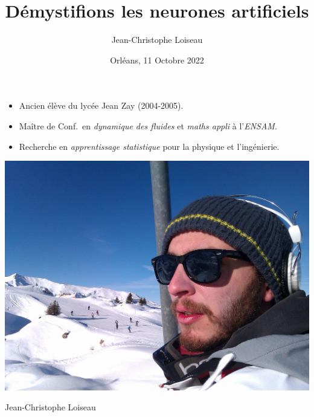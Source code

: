 \documentclass[aspectratio=169, usenames, dvipsnames]{beamer}
\title{Démystifions les neurones artificiels}
\author[JC]{Jean-Christophe Loiseau}
\date[]{Orléans, 11 Octobre 2022}
\begin{document}
\begin{frame}
  \vfill
  \begin{minipage}{.68\textwidth}
    \begin{itemize}

    \item Ancien élève du lycée Jean Zay (2004-2005).
      
      \bigskip
      

    \item Maître de Conf.\ en \emph{dynamique des fluides} et \emph{maths appli} à l'\emph{ENSAM}.

      \bigskip

    \item Recherche en \emph{apprentissage statistique} pour la physique et l'ingénierie.
    \end{itemize}
  \end{minipage}%
  \hfill
  \begin{minipage}{.28\textwidth}
    \centering
    \includegraphics[width=\textwidth]{myself}

    \bigskip

    \tiny Jean-Christophe Loiseau
  \end{minipage}

  \vfill
\end{frame}



\begin{frame}
  \titlepage
\end{frame}
\end{document}
